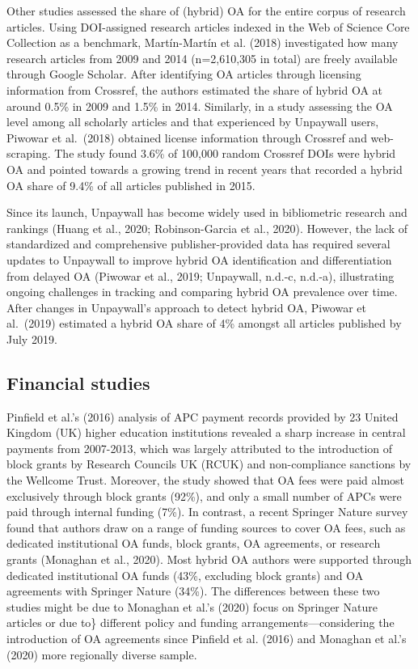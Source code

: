 \documentclass[a4paper,man,floatsintext,longtable,noextraspace,12pt]{apa6}
\begin{document}
Other studies assessed the share of (hybrid) OA for the entire corpus of
research articles. Using DOI-assigned research articles indexed in the
Web of Science Core Collection as a benchmark, Martín-Martín et al.
(2018) investigated how many research articles from 2009 and 2014
(n=2,610,305 in total) are freely available through Google Scholar.
After identifying OA articles through licensing information from
Crossref, the authors estimated the share of hybrid OA at around 0.5\%
in 2009 and 1.5\% in 2014. Similarly, in a study assessing the OA level
among all scholarly articles and that experienced by Unpaywall users,
Piwowar et al.~(2018) obtained license information through Crossref and
web-scraping. The study found 3.6\% of 100,000 random Crossref DOIs were
hybrid OA and pointed towards a growing trend in recent years that
recorded a hybrid OA share of 9.4\% of all articles published in 2015.

Since its launch, Unpaywall has become widely used in bibliometric
research and rankings (Huang et al., 2020; Robinson-Garcia et al.,
2020). However, the lack of standardized and comprehensive
publisher-provided data has required several updates to Unpaywall to
improve hybrid OA identification and differentiation from delayed OA
(Piwowar et al., 2019; Unpaywall, n.d.-c, n.d.-a), illustrating ongoing
challenges in tracking and comparing hybrid OA prevalence over time.
After changes in Unpaywall's approach to detect hybrid OA, Piwowar et
al.~(2019) estimated a hybrid OA share of 4\% amongst all articles
published by July 2019.

\hypertarget{financial-studies}{%
\subsection{Financial studies}\label{financial-studies}}

Pinfield et al.'s (2016) analysis of APC payment records provided by 23
United Kingdom (UK) higher education institutions revealed a sharp
increase in central payments from 2007-2013, which was largely
attributed to the introduction of block grants by Research Councils UK
(RCUK) and non-compliance sanctions by the Wellcome Trust. Moreover, the
study showed that OA fees were paid almost exclusively through block
grants (92\%), and only a small number of APCs were paid through
internal funding (7\%). In contrast, a recent Springer Nature survey
found that authors draw on a range of funding sources to cover OA fees,
such as dedicated institutional OA funds, block grants, OA agreements,
or research grants (Monaghan et al., 2020). Most hybrid OA authors were
supported through dedicated institutional OA funds (43\%, excluding
block grants) and OA agreements with Springer Nature (34\%). The
differences between these two studies might be due to Monaghan et al.'s
(2020) focus on Springer Nature articles or due to\} different policy
and funding arrangements---considering the introduction of OA agreements
since Pinfield et al. (2016) and Monaghan et al.'s (2020) more
regionally diverse sample.
\end{document}
